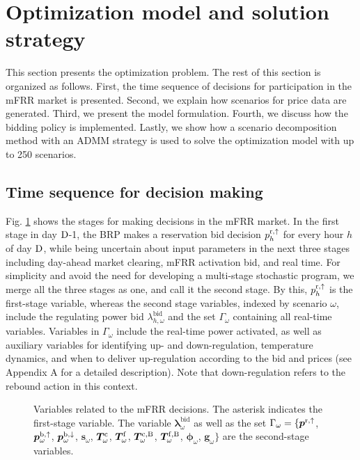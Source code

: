 \section{Optimization model and solution strategy}\label{sec:OptimizationModel}
%
This section presents the optimization problem. The rest of this section is organized as follows. First, the time sequence of decisions for participation in the mFRR market is presented. Second, we explain how scenarios for price data are generated. Third, we present the model formulation. Fourth, we discuss how the bidding policy is implemented. Lastly, we show how a scenario decomposition method with an ADMM strategy is used to solve the optimization model with up to 250 scenarios.

\vspace{-1mm}
\subsection{Time sequence for decision making}
Fig. \ref{fig:timeline_mfrr_variables} shows the stages for making decisions in the mFRR market. In the first stage in day $\rm{D}$-1, the BRP makes a reservation bid decision $p_{h}^{\rm{r},\uparrow}$ for every hour $h$ of day $\rm{D}$,  while being uncertain about input parameters in the next three stages including day-ahead market clearing, mFRR activation bid, and real time. For simplicity and avoid the need for developing a multi-stage stochastic program, we merge all the three stages as one, and call it the second stage. By this, $p_{h}^{\rm{r},\uparrow}$ is the first-stage variable, whereas the second stage variables, indexed by scenario $\omega$, include
the regulating power bid $\lambda_{h,\omega}^{\text{bid}}$ and the set $\Gamma_{\omega}$ containing all real-time variables. Variables in $\Gamma_{\omega}$ include the real-time power activated, as well as auxiliary variables for identifying up- and down-regulation,  temperature dynamics, and when to deliver up-regulation according to the bid and prices (see Appendix A for a detailed description). Note that down-regulation refers to the rebound action in this context.

\begin{figure}[b]
    \centering
    
    \caption{Variables related to the mFRR  decisions. The asterisk indicates the first-stage variable.  The variable $\bm{\lambda}_{\omega}^{\text{bid}}$ as well as the set $\Gamma_{\omega} = \{ \bm{p}^{\rm{r},\uparrow}$, $\bm{p}_{\omega}^{\rm{b},\uparrow}$, $\bm{p}_{\omega}^{\rm{b},\downarrow}$, $\bm{s}_{\omega}$, $\bm{T}_{\omega}^{\rm{c}}$, $\bm{T}_{\omega}^{\rm{f}}$, $\bm{T}_{\omega}^{\rm{c,B}}$, $\bm{T}_{\omega}^{\rm{f,B}}$, $\bm{\phi}_{\omega}$, $\bm{g}_{\omega} \}$ are the second-stage  variables.}
    \label{fig:timeline_mfrr_variables}
\end{figure}


